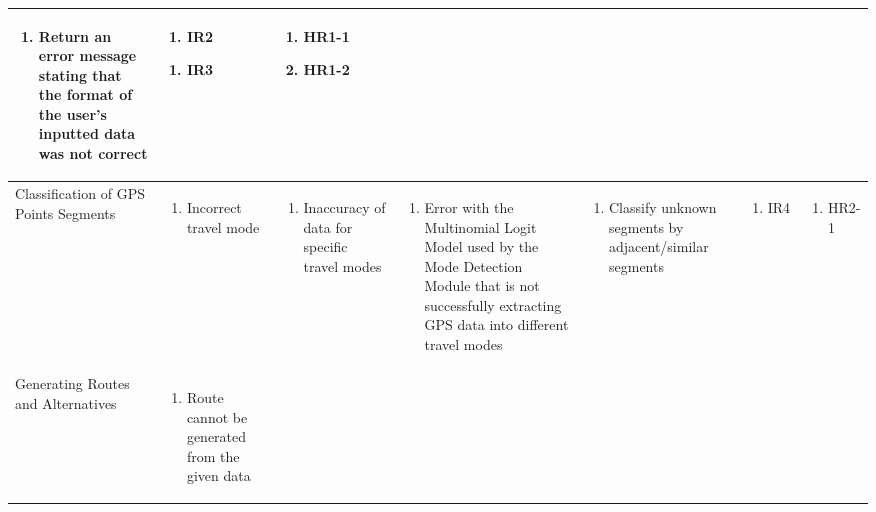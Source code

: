 \documentclass{article}
\begin{document}
\begin{landscape}
\begin{longtable}{|p{4cm}|p{2.5cm}|p{3.5cm}|p{3cm}|p{5.5cm}|p{1.8cm}|p{2cm}|}
\begin{enumerate}[label=2\alph*.]
     \item Return an error message stating that the format of the user's inputted data was not correct
 \end{enumerate}
&  
\begin{enumerate}[label=1\alph*.]
     \item IR2
 \end{enumerate}
 \begin{enumerate}[label=2\alph*.]
     \item IR3
 \end{enumerate}
&
\begin{enumerate}
     \item HR1-1
     \item HR1-2
 \end{enumerate}
 \\
 \hline
 Classification of GPS Points Segments
 &
  \begin{enumerate}
     \item Incorrect travel mode
 \end{enumerate}
 & 
  \begin{enumerate}
     \item Inaccuracy of data for specific travel modes
 \end{enumerate}
 &
 \begin{enumerate}[label=1\alph*.]
     \item Error with the Multinomial Logit Model used by the Mode Detection Module that is not successfully extracting GPS data into different travel modes
 \end{enumerate}
 &
  \begin{enumerate}[label=1\alph*.]
     \item Classify unknown segments by adjacent/similar segments
 \end{enumerate}
  & \begin{enumerate}[label=1\alph*.]
     \item IR4
 \end{enumerate}
 &
 \begin{enumerate}
     \item HR2-1
 \end{enumerate}
 \\
 \hline
 Generating Routes and Alternatives
 &   
 \begin{enumerate}
     \item Route cannot be generated from the given data
 \end{enumerate}
& 
 \begin{enumerate}[label=1\alph*.]

\end{enumerate}
\end{longtable}
\end{landscape}
\end{document}
